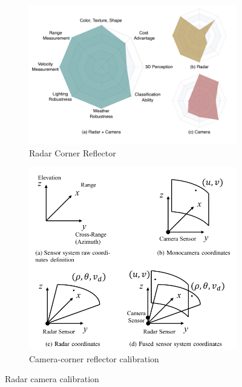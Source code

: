 \begin{figure}[hbpt]
    \centering
    \begin{subfigure}{0.25\linewidth}
        \includegraphics[width=\textwidth]{Figures/trade_off.png}
        \caption{Radar Corner Reflector}
        \label{subfig:trade_off_sub}
    \end{subfigure}
    \hfill
    \begin{subfigure}{0.25\linewidth}
        \centering
        \includegraphics[width=\textwidth]{Figures/cam_radar_coordinates.png}
        \caption{Camera-corner reflector calibration}
        \label{subfig:cam_radar_sub}
    \end{subfigure}

    \caption{Radar camera calibration}
    \label{fig:trade_off_and_plane}
\end{figure}




